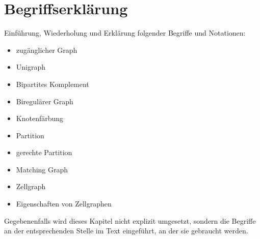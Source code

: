 \section{Begriffserklärung}

Einführung, Wiederholung und Erklärung folgender Begriffe und Notationen:
\begin{itemize}
	\item zugänglicher Graph
	\item Unigraph
	\item Bipartites Komplement
	\item Biregulärer Graph
	\item Knotenfärbung
	\item Partition
	\item gerechte Partition
	\item Matching Graph
	\item Zellgraph
	\item Eigenschaften von Zellgraphen
\end{itemize}

Gegebenenfalls wird dieses Kapitel nicht explizit umgesetzt, sondern die Begriffe an der entsprechenden Stelle im Text eingeführt, an der sie gebraucht werden.
